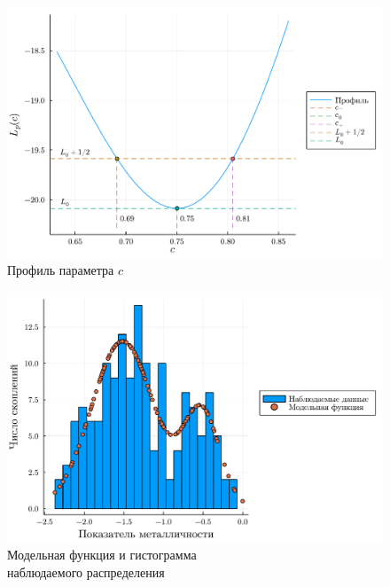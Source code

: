 \documentclass[a4paper, oneside]{article}
\begin{document}
\begin{figure}[h!]
  \centering
  \includegraphics[scale=0.5]{c}
  \caption{Профиль параметра $ c $}
\end{figure}

\newpage

\begin{figure}[h!]
  \centering
  \includegraphics[scale=0.5]{histogram}
  \caption{Модельная функция и гистограмма \\ наблюдаемого распределения}
\end{figure}
\end{document}

